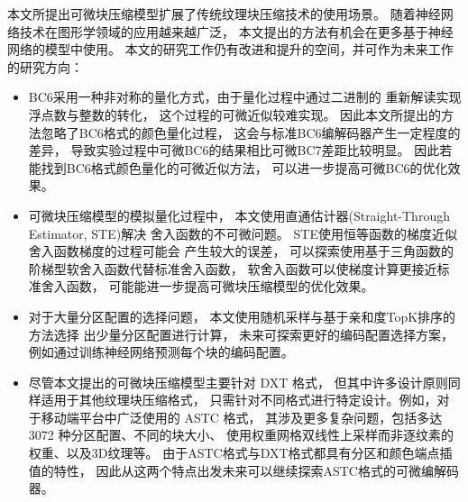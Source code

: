 本文所提出可微块压缩模型扩展了传统纹理块压缩技术的使用场景。
随着神经网络技术在图形学领域的应用越来越广泛，
本文提出的方法有机会在更多基于神经网络的模型中使用。
本文的研究工作仍有改进和提升的空间，并可作为未来工作的研究方向：
\begin{itemize}
    \item BC6采用一种非对称的量化方式，由于量化过程中通过二进制的
    重新解读实现浮点数与整数的转化，
    这个过程的可微近似较难实现。
    因此本文所提出的方法忽略了BC6格式的颜色量化过程，
    这会与标准BC6编解码器产生一定程度的差异，
    导致实验过程中可微BC6的结果相比可微BC7差距比较明显。
    因此若能找到BC6格式颜色量化的可微近似方法，
    可以进一步提高可微BC6的优化效果。

    \item 可微块压缩模型的模拟量化过程中，
    本文使用直通估计器(Straight-Through Estimator, STE)解决
    舍入函数的不可微问题。
    STE使用恒等函数的梯度近似舍入函数梯度的过程可能会
    产生较大的误差，
    可以探索使用基于三角函数的阶梯型软舍入函数代替标准舍入函数，
    软舍入函数可以使梯度计算更接近标准舍入函数，
    可能能进一步提高可微块压缩模型的优化效果。

    \item   
    对于大量分区配置的选择问题，
    本文使用随机采样与基于亲和度TopK排序的方法选择
    出少量分区配置进行计算，
    未来可探索更好的编码配置选择方案，
    例如通过训练神经网络预测每个块的编码配置。


    \item   
    尽管本文提出的可微块压缩模型主要针对 DXT 格式，
    但其中许多设计原则同样适用于其他纹理块压缩格式，
    只需针对不同格式进行特定设计。例如，对于移动端平台中广泛使用的 ASTC 格式，
    其涉及更多复杂问题，包括多达 3072 种分区配置、不同的块大小、
    使用权重网格双线性上采样而非逐纹素的权重、以及3D纹理等。
    由于ASTC格式与DXT格式都具有分区和颜色端点插值的特性，
    因此从这两个特点出发未来可以继续探索ASTC格式的可微编解码器。


\end{itemize}




